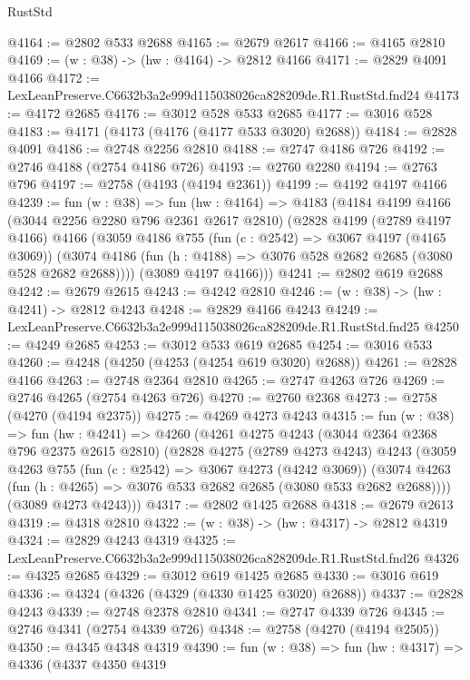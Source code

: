 \begin{lexlean}{RustStd}
\begin{coremodule}
@4164 := @2802 @533 @2688
@4165 := @2679 @2617
@4166 := @4165 @2810
@4169 := (w : @38) -> (hw : @4164) -> @2812 @4166
@4171 := @2829 @4091 @4166
@4172 := LexLeanPreserve.C6632b3a2e999d115038026ca828209de.R1.RustStd.fnd24
@4173 := @4172 @2685
@4176 := @3012 @528 @533 @2685
@4177 := @3016 @528
@4183 := @4171 (@4173 (@4176 (@4177 @533 @3020) @2688))
@4184 := @2828 @4091
@4186 := @2748 @2256 @2810
@4188 := @2747 @4186 @726
@4192 := @2746 @4188 (@2754 @4186 @726)
@4193 := @2760 @2280
@4194 := @2763 @796
@4197 := @2758 (@4193 (@4194 @2361))
@4199 := @4192 @4197 @4166
@4239 := fun (w : @38) =>
  fun (hw : @4164) =>
  @4183
    (@4184
      @4199
      @4166
      (@3044 @2256 @2280 @796 @2361 @2617 @2810)
      (@2828
        @4199
        (@2789 @4197 @4166)
        @4166
        (@3059
          @4186
          @755
          (fun (c : @2542) => @3067 @4197 (@4165 @3069))
          (@3074 @4186 (fun (h : @4188) => @3076 @528 @2682 @2685 (@3080 @528 @2682 @2688))))
        (@3089 @4197 @4166)))
@4241 := @2802 @619 @2688
@4242 := @2679 @2615
@4243 := @4242 @2810
@4246 := (w : @38) -> (hw : @4241) -> @2812 @4243
@4248 := @2829 @4166 @4243
@4249 := LexLeanPreserve.C6632b3a2e999d115038026ca828209de.R1.RustStd.fnd25
@4250 := @4249 @2685
@4253 := @3012 @533 @619 @2685
@4254 := @3016 @533
@4260 := @4248 (@4250 (@4253 (@4254 @619 @3020) @2688))
@4261 := @2828 @4166
@4263 := @2748 @2364 @2810
@4265 := @2747 @4263 @726
@4269 := @2746 @4265 (@2754 @4263 @726)
@4270 := @2760 @2368
@4273 := @2758 (@4270 (@4194 @2375))
@4275 := @4269 @4273 @4243
@4315 := fun (w : @38) =>
  fun (hw : @4241) =>
  @4260
    (@4261
      @4275
      @4243
      (@3044 @2364 @2368 @796 @2375 @2615 @2810)
      (@2828
        @4275
        (@2789 @4273 @4243)
        @4243
        (@3059
          @4263
          @755
          (fun (c : @2542) => @3067 @4273 (@4242 @3069))
          (@3074 @4263 (fun (h : @4265) => @3076 @533 @2682 @2685 (@3080 @533 @2682 @2688))))
        (@3089 @4273 @4243)))
@4317 := @2802 @1425 @2688
@4318 := @2679 @2613
@4319 := @4318 @2810
@4322 := (w : @38) -> (hw : @4317) -> @2812 @4319
@4324 := @2829 @4243 @4319
@4325 := LexLeanPreserve.C6632b3a2e999d115038026ca828209de.R1.RustStd.fnd26
@4326 := @4325 @2685
@4329 := @3012 @619 @1425 @2685
@4330 := @3016 @619
@4336 := @4324 (@4326 (@4329 (@4330 @1425 @3020) @2688))
@4337 := @2828 @4243
@4339 := @2748 @2378 @2810
@4341 := @2747 @4339 @726
@4345 := @2746 @4341 (@2754 @4339 @726)
@4348 := @2758 (@4270 (@4194 @2505))
@4350 := @4345 @4348 @4319
@4390 := fun (w : @38) =>
  fun (hw : @4317) =>
  @4336
    (@4337
      @4350
      @4319

\end{coremodule}
\end{lexlean}
